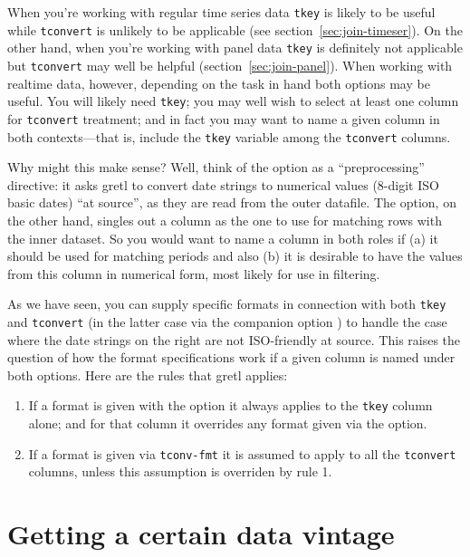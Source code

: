 When you're working with regular time series data \texttt{tkey} is
likely to be useful while \texttt{tconvert} is unlikely to be
applicable (see section~\ref{sec:join-timeser}). On the other hand,
when you're working with panel data \texttt{tkey} is definitely not
applicable but \texttt{tconvert} may well be helpful
(section~\ref{sec:join-panel}). When working with realtime data,
however, depending on the task in hand both options may be useful. You
will likely need \texttt{tkey}; you may well wish to select at least
one column for \texttt{tconvert} treatment; and in fact you may want
to name a given column in both contexts---that is, include the
\texttt{tkey} variable among the \texttt{tconvert} columns.

Why might this make sense? Well, think of the  option
as a ``preprocessing'' directive: it asks gretl to convert date
strings to numerical values (8-digit ISO basic dates) ``at source'',
as they are read from the outer datafile. The  option, on
the other hand, singles out a column as the one to use for matching
rows with the inner dataset. So you would want to name a column in
both roles if (a) it should be used for matching periods and also (b)
it is desirable to have the values from this column in numerical
form, most likely for use in filtering.

As we have seen, you can supply specific formats in connection with
both \texttt{tkey} and \texttt{tconvert} (in the latter case via the
companion option ) to handle the case where the
date strings on the right are not ISO-friendly at source. This raises
the question of how the format specifications work if a given
column is named under both options.  Here are the rules that gretl
applies:
\begin{enumerate}
\item If a format is given with the  option it always
  applies to the \texttt{tkey} column alone; and for that column it
  overrides any format given via the  option.
\item If a format is given via \texttt{tconv-fmt} it is assumed to
  apply to all the \texttt{tconvert} columns, unless this assumption
  is overriden by rule 1.
\end{enumerate}

\section{Getting a certain data vintage}
\label{sec:realtime-vintage}

